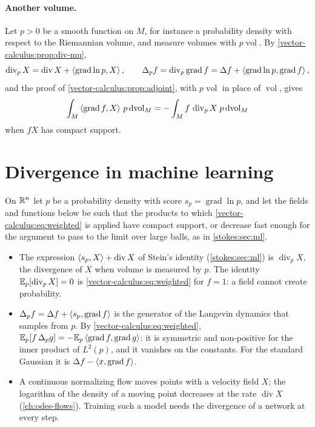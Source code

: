 \begin{notechapter}
\paragraph{Another volume.} Let $p > 0$ be a smooth function on $M$,
for instance a probability density with respect to the Riemannian
volume, and measure volumes with $p\operatorname{vol}$. By
\cref{vector-calculus:prop:div-mu},
\[
  \operatorname{div}_pX
  = \operatorname{div}X + \left\langle \operatorname{grad}\ln p, X \right\rangle ,
  \qquad
  \Delta_pf = \operatorname{div}_p\operatorname{grad}f
  = \Delta f + \left\langle \operatorname{grad}\ln p, \operatorname{grad}f \right\rangle ,
\]
and the proof of \cref{vector-calculus:prop:adjoint}, with
$p\operatorname{vol}$ in place of $\operatorname{vol}$, gives
\begin{equation}\label{vector-calculus:eq:weighted}
  \int_M\left\langle \operatorname{grad}f, X \right\rangle\,p\,\mathrm{d}\!\operatorname{vol}_M
  = -\int_Mf\,\operatorname{div}_pX\;p\,\mathrm{d}\!\operatorname{vol}_M
\end{equation}
when $fX$ has compact support.

\section{Divergence in machine learning}\label{vector-calculus:sec:ml}

\begin{mlthread}
On $\mathbb{R}^n$ let $p$ be a probability density with score
$s_p = \operatorname{grad}\ln p$, and let the fields and functions
below be such that the products to which
\eqref{vector-calculus:eq:weighted} is applied have compact support,
or decrease fast enough for the argument to pass to the limit over
large balls, as in \cref{stokes:sec:ml}.
\begin{itemize}[nosep]
  \item The expression $\left\langle s_p, X \right\rangle + \operatorname{div}X$ of Stein's
        identity (\cref{stokes:sec:ml}) is
        $\operatorname{div}_pX$, the divergence of $X$ when volume is
        measured by $p$. The identity $\mathbb{E}_p[\operatorname{div}_pX] = 0$
        is \eqref{vector-calculus:eq:weighted} for $f = 1$: a field
        cannot create probability.
  \item $\Delta_pf = \Delta f + \left\langle s_p, \operatorname{grad}f \right\rangle$ is
        the generator of the Langevin dynamics that samples from $p$.
        By \eqref{vector-calculus:eq:weighted},
        $\mathbb{E}_p[f\,\Delta_pg]
        = -\mathbb{E}_p\left\langle \operatorname{grad}f, \operatorname{grad}g \right\rangle$: it
        is symmetric and non-positive for the inner product of
        $L^2(p)$, and it vanishes on the constants. For the standard
        Gaussian it is
        $\Delta f - \left\langle x, \operatorname{grad}f \right\rangle$.
  \item A continuous normalizing flow moves points with a velocity
        field $X$; the logarithm of the density of a moving point
        decreases at the rate $\operatorname{div}X$
        (\cref{ch:odes-flows}). Training such a model needs the
        divergence of a network at every step.
\end{itemize}
\end{mlthread}


\end{notechapter}
